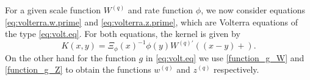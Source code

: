 \documentclass[12pt,reqno]{amsart}
\theoremstyle{definition}
\theoremstyle{remark}
\begin{document}
 For a given scale function $W^{(q)}$ and rate function $\phi$, we now consider equations
 \eqref{eq:volterra.w.prime} and  \eqref{eq:volterra.z.prime}, which are Volterra equations of the type \eqref{eq:volt.eq}.
For both equations,
the kernel is given by
\[
K(x,y)= \Xi_{\phi}(x)^{-1}\phi(y) W^{(q)\prime}((x-y)+).
\]
On the other hand for the function $g$ in \eqref{eq:volt.eq} we use \eqref{function_g_W} and \eqref{function_g_Z} 
to obtain the functions $w^{(q)}$ and $z^{(q)}$ respectively.




\begin{comment}
  We review now results concerning the smoothness of scale functions (see eg. \cite{kuznetsovetal2012, kyprianou2006}).
  \begin{itemize}
    \item For all $q\ge0$, $W^{(q)}(0)=0 $ if and only if $X$ has unbounded variation. \item Otherwise $W^{q)}(0)=1/c$, where $c$ is the drift.
  \item For all $q\ge0$, $W^{(q)}$ is continuous, a.e. differentiable and strictly increasing.
  \item For each $q\ge0$, $W^{(q)}\in {\mathcal C}^{1}(0,\infty)$ if and only if one of the following holds: (i) $\sigma\neq0$, (ii) $\int_0^1 x\Pi(dx)=\infty$,
    (iii) $\Pi(x)=\Pi(x,\infty)$ is continuous.
    \item If $X$ has unbounded variation, the ${W^{(q)\prime}}(0)=2/\sigma^2$. \item If $X$ has bounded variation, then ${W^{(q)\prime}}(0)=\frac{\Pi(0,\infty)+q}{c^2}$.
    \end{itemize}
Furthermore $Z^{(q)}(0)=1$ and $Z^{(q)^{\prime}}(0)=qW^{(q)}(0)$.
\end{comment}
\end{document}
